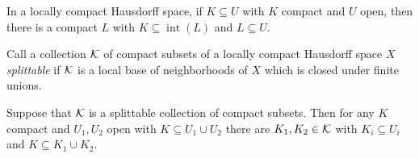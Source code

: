\documentclass[letterpaper,11pt]{report}
\DeclareMathOperator{\inter}{int}
\begin{document}



\begin{prop} In a locally compact Hausdorff space, if $K \subseteq U$ with $K$ compact and $U$ open, then there is a compact $L$ with $K \subseteq \inter(L)$ and $L \subseteq U$.
\end{prop}

\begin{defn} Call a collection $\mathcal{K}$ of compact subsets of a locally compact Hausdorff space $X$ \emph{splittable} if $\mathcal{K}$ is a local base of neighborhoods of $X$ which is closed under finite unions.
\end{defn}

\begin{prop} Suppose that $\mathcal{K}$ is a splittable collection of compact subsets. Then for any $K$ compact and $U_1,U_2$ open with $K \subseteq U_1 \cup U_2$ there are $K_1,K_2 \in \mathcal{K}$ with $K_i \subseteq U_i$ and $K \subseteq K_1\cup K_2$.
\end{prop}
\end{document}
